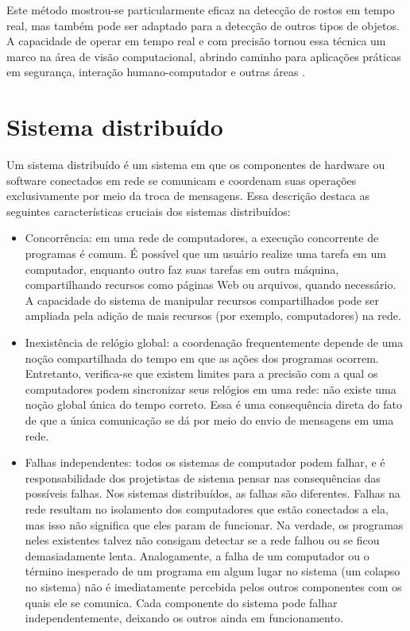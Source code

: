 \documentclass[12pt, %
openright, 
oneside, %
a4paper,    %
brazil]{facom-ufu-abntex2}
\begin{document}
Este método mostrou-se particularmente eficaz na detecção de rostos em tempo
real, mas também pode ser adaptado para a detecção de outros tipos de objetos.
A capacidade de operar em tempo real e com precisão tornou essa técnica um
marco na área de visão computacional, abrindo caminho para aplicações práticas
em segurança, interação humano-computador e outras áreas \cite{990517}.

\section{Sistema distribuído}

Um sistema distribuído é um sistema em que os componentes de hardware ou
software conectados em rede se comunicam e coordenam suas operações
exclusivamente por meio da troca de mensagens. Essa descrição destaca as
seguintes características cruciais dos sistemas distribuídos:

\begin{itemize}
	\item Concorrência: em uma rede de computadores, a execução concorrente de programas
	      é comum. É possível que um usuário realize uma tarefa em um computador,
	      enquanto outro faz suas tarefas em outra máquina, compartilhando recursos como
	      páginas Web ou arquivos, quando necessário. A capacidade do sistema de
	      manipular recursos compartilhados pode ser ampliada pela adição de mais
	      recursos (por exemplo, computadores) na rede.
	\item Inexistência de relógio global: a coordenação frequentemente depende de uma
	      noção compartilhada do tempo em que as ações dos programas ocorrem. Entretanto,
	      verifica-se que existem limites para a precisão com a qual os computadores
	      podem sincronizar seus relógios em uma rede: não existe uma noção global única
	      do tempo correto. Essa é uma consequência direta do fato de que a única
	      comunicação se dá por meio do envio de mensagens em uma rede.
	\item Falhas independentes: todos os sistemas de computador podem falhar, e é
	      responsabilidade dos projetistas de sistema pensar nas consequências das
	      possíveis falhas. Nos sistemas distribuídos, as falhas são diferentes. Falhas
	      na rede resultam no isolamento dos computadores que estão conectados a ela, mas
	      isso não significa que eles param de funcionar. Na verdade, os programas neles
	      existentes talvez não consigam detectar se a rede falhou ou se ficou
	      demasiadamente lenta. Analogamente, a falha de um computador ou o término
	      inesperado de um programa em algum lugar no sistema (um colapso no sistema) não
	      é imediatamente percebida pelos outros componentes com os quais ele se
	      comunica. Cada componente do sistema pode falhar independentemente, deixando os
	      outros ainda em funcionamento.
\end{itemize}
\end{document}
